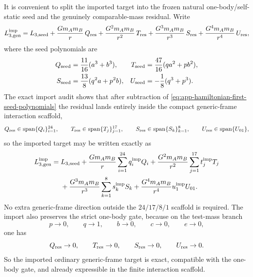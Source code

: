 \documentclass[11pt]{article}
\begin{document}
It is convenient to split the imported target into the frozen natural
one-body/self-static seed and the genuinely comparable-mass residual.  Write
\begin{equation}
L_{3,\mathrm{gen}}^{\mathrm{imp}}
=
L_{3,\mathrm{seed}}
+\frac{Gm_A m_B}{r}\,Q_{\rm res}
+\frac{G^2m_A m_B}{r^2}\,T_{\rm res}
+\frac{G^3m_A m_B}{r^3}\,S_{\rm res}
+\frac{G^4m_A m_B}{r^4}\,U_{\rm res},
\label{eq:app-hamiltonian-first-import-split}
\end{equation}
where the seed polynomials are
\begin{equation}
\begin{aligned}
Q_{\rm seed}&=\frac{11}{16}(a^3+b^3),
& T_{\rm seed}&=\frac{47}{16}(qa^2+pb^2),
\\
S_{\rm seed}&=\frac{13}{8}(q^2a+p^2b),
& U_{\rm seed}&=-\frac18(q^3+p^3).
\end{aligned}
\label{eq:app-hamiltonian-first-seed-polynomials}
\end{equation}
The exact import audit shows that after subtraction of
\eqref{eq:app-hamiltonian-first-seed-polynomials} the residual lands entirely
inside the compact generic-frame interaction scaffold,
\begin{equation}
Q_{\rm res}\in\mathrm{span}\{Q_i\}_{i=1}^{24},
\qquad
T_{\rm res}\in\mathrm{span}\{T_j\}_{j=1}^{17},
\qquad
S_{\rm res}\in\mathrm{span}\{S_k\}_{k=1}^{8},
\qquad
U_{\rm res}\in\mathrm{span}\{U_{01}\},
\label{eq:app-hamiltonian-first-scaffold-membership}
\end{equation}
so the imported target may be written exactly as
\begin{equation}
\begin{aligned}
L_{3,\mathrm{gen}}^{\mathrm{imp}}
=\;&L_{3,\mathrm{seed}}
+\frac{Gm_A m_B}{r}\sum_{i=1}^{24} q_i^{\rm imp} Q_i
+\frac{G^2m_A m_B}{r^2}\sum_{j=1}^{17} t_j^{\rm imp} T_j
\\
&+\frac{G^3m_A m_B}{r^3}\sum_{k=1}^{8} s_k^{\rm imp} S_k
+\frac{G^4m_A m_B}{r^4}u_1^{\rm imp}U_{01}.
\end{aligned}
\label{eq:app-hamiltonian-first-import-scaffold}
\end{equation}
No extra generic-frame direction outside the $24/17/8/1$ scaffold is required.
The import also preserves the strict one-body gate, because on the test-mass
branch
\begin{equation}
 p\to 0,
 \qquad
 q\to 1,
 \qquad
 b\to 0,
 \qquad
 c\to 0,
 \qquad
 e\to 0,
\label{eq:app-hamiltonian-first-testmass-branch}
\end{equation}
one has
\begin{equation}
Q_{\rm res}\to 0,
\qquad
T_{\rm res}\to 0,
\qquad
S_{\rm res}\to 0,
\qquad
U_{\rm res}\to 0.
\label{eq:app-hamiltonian-first-testmass-vanish}
\end{equation}
So the imported ordinary generic-frame target is exact, compatible with the
one-body gate, and already expressible in the finite interaction scaffold.
\end{document}
